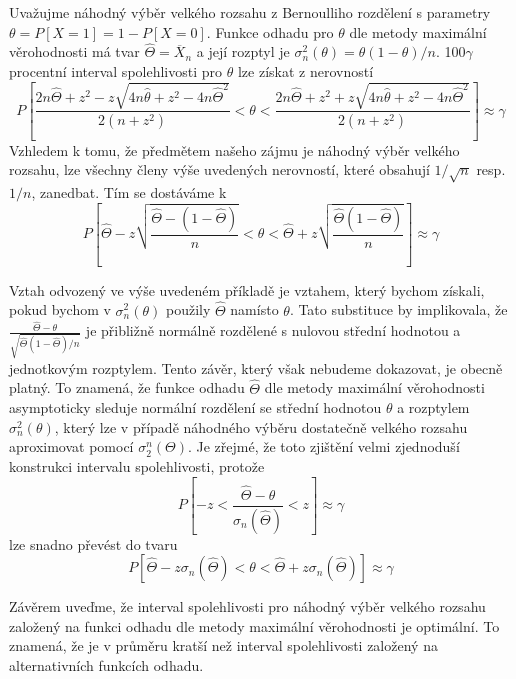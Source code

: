 \begin{example}
Uvažujme náhodný výběr velkého rozsahu z Bernoulliho rozdělení s parametry $\theta = P[X = 1] = 1 - P[X = 0]$. Funkce odhadu pro $\theta$ dle metody maximální věrohodnosti má tvar $\hat{\Theta} = \overline{X}_n$ a její rozptyl je $\sigma_n^2(\theta) = \theta(1 - \theta)/n$. 100$\gamma$ procentní interval spolehlivosti pro $\theta$ lze získat z nerovností
\begin{equation*}
P \left[\frac{2n \hat{\Theta} + z^2 - z \sqrt{4n \hat{\theta} + z^2 - 4n \hat{\Theta}^2}}{2(n + z^2)} < \theta < \frac{2n \hat{\Theta} + z^2 + z \sqrt{4n \hat{\theta} + z^2 - 4n \hat{\Theta}^2}}{2(n + z^2)} \right] \approx \gamma
\end{equation*}
Vzhledem k tomu, že předmětem našeho zájmu je náhodný výběr velkého rozsahu, lze všechny členy výše uvedených nerovností, které obsahují $1/\sqrt{n}$ resp. $1 / n$, zanedbat. Tím se dostáváme k
\begin{equation*}
P\left[\hat{\Theta} - z \sqrt{\frac{\hat{\Theta} - (1 - \hat{\Theta})}{n}} < \theta < \hat{\Theta} + z \sqrt{\frac{\hat{\Theta}(1 - \hat{\Theta})}{n}} \right] \approx \gamma
\end{equation*} 
\end{example}
Vztah odvozený ve výše uvedeném příkladě je vztahem, který bychom získali, pokud bychom v $\sigma_n^2(\theta)$ použily $\hat{\Theta}$ namísto $\theta$. Tato substituce by implikovala, že $\frac{\hat{\Theta} - \theta}{\sqrt{\hat{\Theta}(1 - \hat{\Theta})/n}}$ je přibližně normálně rozdělené s nulovou střední hodnotou a jednotkovým rozptylem. Tento závěr, který však nebudeme dokazovat, je obecně platný. To znamená, že funkce odhadu $\hat{\Theta}$ dle metody maximální věrohodnosti asymptoticky sleduje normální rozdělení se střední hodnotou $\theta$ a rozptylem $\sigma_n^2(\theta)$, který lze v případě náhodného výběru dostatečně velkého rozsahu aproximovat pomocí $\sigma_2^n(\Theta)$. Je zřejmé, že toto zjištění velmi zjednoduší konstrukci intervalu spolehlivosti, protože
\begin{equation*}
P\left[-z < \frac{\hat{\Theta} - \theta}{\sigma_n(\hat{\Theta})} < z \right] \approx \gamma
\end{equation*}
lze snadno převést do tvaru
\begin{equation*}
P[\hat{\Theta} - z \sigma_n(\hat{\Theta}) < \theta < \hat{\Theta} + z \sigma_n(\hat{\Theta})] \approx \gamma
\end{equation*}

Závěrem uveďme, že interval spolehlivosti pro náhodný výběr velkého rozsahu založený na funkci odhadu dle metody maximální věrohodnosti je optimální. To znamená, že je v průměru kratší než interval spolehlivosti založený na alternativních funkcích odhadu.

